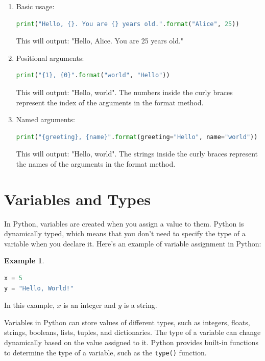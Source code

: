 \documentclass[12pt]{article}
\newtheorem{Example}{Example}[section]
\begin{document}
\begin{enumerate}
    \item Basic usage: \\
    \begin{lstlisting}[language=Python]
    print("Hello, {}. You are {} years old.".format("Alice", 25))
    \end{lstlisting}
    This will output: "Hello, Alice. You are 25 years old." 

    \item Positional arguments: \\
    \begin{lstlisting}[language=Python]
    print("{1}, {0}".format("world", "Hello"))
    \end{lstlisting}
    This will output: "Hello, world". The numbers inside the curly braces represent the index of the arguments in the format method.

    \item Named arguments: \\
    \begin{lstlisting}[language=Python]
    print("{greeting}, {name}".format(greeting="Hello", name="world"))
    \end{lstlisting}
    This will output: "Hello, world". The strings inside the curly braces represent the names of the arguments in the format method.
\end{enumerate}

\section{Variables and Types}

In Python, variables are created when you assign a value to them. Python is dynamically typed, which means that you don't need to specify the type of a variable when you declare it. Here's an example of variable assignment in Python:
\begin{Example}
\begin{lstlisting}[language=Python]
x = 5
y = "Hello, World!"
\end{lstlisting}
\end{Example}
In this example, $x$ is an integer and $y$ is a string.

Variables in Python can store values of different types, such as integers, floats, strings, booleans, lists, tuples, and dictionaries. The type of a variable can change dynamically based on the value assigned to it. Python provides built-in functions to determine the type of a variable, such as the \texttt{type()} function.
\end{document}
